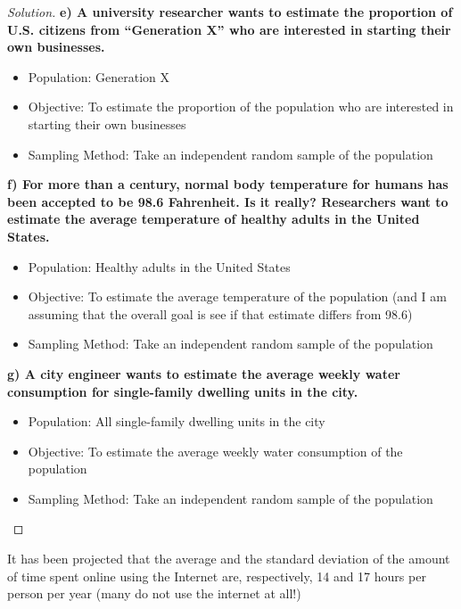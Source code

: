 \documentclass[10pt]{article}
\newenvironment{problem}[2][Problem]{\begin{trivlist}
		\item[\hskip \labelsep {\bfseries #1}\hskip \labelsep {\bfseries #2.}]}{\end{trivlist}}
\newenvironment{solution}{\begin{proof}[Solution]}{\end{proof}}
\begin{document}
\begin{solution}
		\textbf{e) A university researcher wants to estimate the proportion of U.S. citizens from “Generation X” who are interested in starting their own businesses.}
	\begin{itemize}
	\item Population: Generation X
	\item Objective: To estimate the proportion of the population who are interested in starting their own businesses
	\item Sampling Method: Take an independent random sample of the population
	\end{itemize}
		\textbf{f) For more than a century, normal body temperature for humans has been accepted to be 98.6 Fahrenheit. Is it really? Researchers want to estimate the average temperature of healthy adults in the United States.}
	\begin{itemize}
	\item Population: Healthy adults in the United States
	\item Objective: To estimate the average temperature of the population (and I am assuming that the overall goal is see if that estimate differs from 98.6) 
	\item Sampling Method: Take an independent random sample of the population
	\end{itemize}
		\textbf{g) A city engineer wants to estimate the average weekly water consumption for single-family dwelling units in the city.}
	\begin{itemize}
	\item Population: All single-family dwelling units in the city
	\item Objective: To estimate the average weekly water consumption of the population
	\item Sampling Method: Take an independent random sample of the population
	\end{itemize}
    \end{solution}
	
	
	
	\vspace{0.15in} %
	
	\begin{problem}{1.10}
	It has been projected that the average and the standard deviation of the amount of time spent online using the Internet are, respectively, 14 and 17 hours per person per year (many do not use the internet at all!) 
	\end{problem}
	
\end{document}
